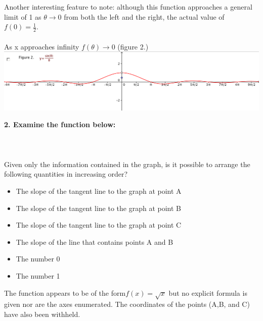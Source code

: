 \documentclass{article}
\begin{document}
\begin{enumerate}
Another interesting feature to note: although this function approaches a general limit of 1 as $\theta \to 0$ from both the left and the right, the actual value of $f(0) = \frac{1}{2}$.\\
\\
As x approaches infinity $f (\theta) \to 0$ (figure 2.)\\
%
{\includegraphics[scale=0.45]{longview}}\\


\vspace{8 mm}

{\bfseries 2. Examine the function below:}\\
\\
\\
%
\\Given only the information contained in the graph, is it possible to arrange the following quantities in increasing order? 
%
\begin{itemize}
%
	\item The slope of the tangent line to the graph at point A
	\item The slope of the tangent line to the graph at point B
	\item The slope of the tangent line to the graph at point C
	\item The slope of the line that contains points A and B
	\item The number 0
	\item The number 1
%	
\end{itemize}
The function appears to be of the form$f(x)= \sqrt{x}$ but no explicit formula is given nor are the axes enumerated. The coordinates of the points (A,B, and C) have also been withheld.  \\


\end{enumerate}
\end{document}

